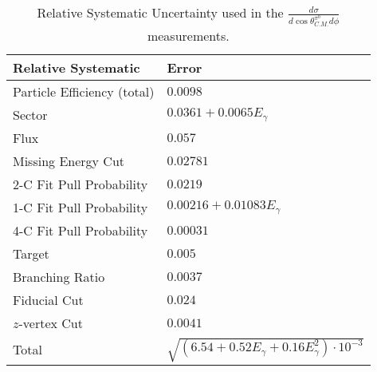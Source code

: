 \begin{table}[h!]
\begin{center}


\caption[Systematics]{\label{tab:systematics}Relative Systematic Uncertainty used in the $\frac{d\sigma}{d\cos\theta^{\pi^0}_{C.M.} d\phi}$ measurements. \vspace{0.75mm}}

\begin{tabular}{p{5.25cm} | p{5.35cm}}
\hline
Relative Systematic & Error \\
\hline
Particle Efficiency (total) & $0.0098$ \\
Sector  & $ 0.0361 + 0.0065E_{\gamma}$ \\
Flux  & $ 0.057$ \\
Missing Energy Cut  & $0.02781$ \\
2-C Fit Pull Probability & $0.0219$ \\
1-C Fit Pull Probability  & $ 0.00216 + 0.01083E_{\gamma}$ \\
4-C Fit Pull Probability  & $0.00031$ \\ 
Target  & $0.005$ \\
Branching Ratio  & $0.0037$ \\
Fiducial Cut & $0.024$ \\
$z$-vertex Cut & $0.0041$ \\
Total & $\sqrt{(6.54 +0.52E_{\gamma} +0.16E_{\gamma}^2)\cdot10^{-3}}$ \\
\hline \hline
\end{tabular}


\end{center}
\end{table}
\vspace{20pt}